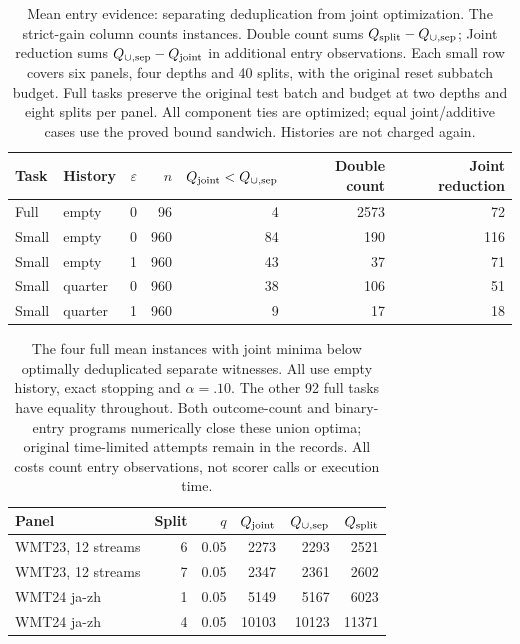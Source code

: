 \begin{table}[t]
\centering\small
\begin{tabular}{llrrrrr}
\toprule
Task & History & $\varepsilon$ & $n$ & $Q_{\rm joint}<Q_{\cup,\rm sep}$ & Double count & Joint reduction \\
\midrule
Full & empty & 0 & 96 & 4 & 2573 & 72 \\
Small & empty & 0 & 960 & 84 & 190 & 116 \\
Small & empty & 1 & 960 & 43 & 37 & 71 \\
Small & quarter & 0 & 960 & 38 & 106 & 51 \\
Small & quarter & 1 & 960 & 9 & 17 & 18 \\
\bottomrule
\end{tabular}
\caption{Mean entry evidence: separating deduplication from joint optimization. The strict-gain column counts instances. Double count sums $Q_{\rm split}-Q_{\cup,\rm sep}$; Joint reduction sums $Q_{\cup,\rm sep}-Q_{\rm joint}$ in additional entry observations. Each small row covers six panels, four depths and 40 splits, with the original reset subbatch budget. Full tasks preserve the original test batch and budget at two depths and eight splits per panel. All component ties are optimized; equal joint/additive cases use the proved bound sandwich. Histories are not charged again.}
\label{tab:deduplicated-summary}
\end{table}
\begin{table}[t]
\centering\small
\begin{tabular}{lrrrrr}
\toprule
Panel & Split & $q$ & $Q_{\rm joint}$ & $Q_{\cup,\rm sep}$ & $Q_{\rm split}$ \\
\midrule
WMT23, 12 streams & 6 & 0.05 & 2273 & 2293 & 2521 \\
WMT23, 12 streams & 7 & 0.05 & 2347 & 2361 & 2602 \\
WMT24 ja-zh & 1 & 0.05 & 5149 & 5167 & 6023 \\
WMT24 ja-zh & 4 & 0.05 & 10103 & 10123 & 11371 \\
\bottomrule
\end{tabular}
\caption{The four full mean instances with joint minima below optimally deduplicated separate witnesses. All use empty history, exact stopping and $\alpha=.10$. The other 92 full tasks have equality throughout. Both outcome-count and binary-entry programs numerically close these union optima; original time-limited attempts remain in the records. All costs count entry observations, not scorer calls or execution time.}
\label{tab:deduplicated-full}
\end{table}
